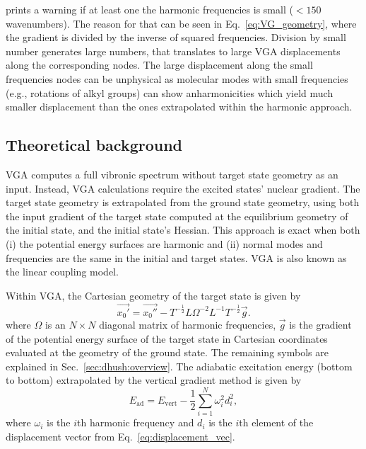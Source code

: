 \documentclass[11pt]{article}
\begin{document}
\ezFCF{} prints a warning if at least one the harmonic frequencies is 
small ($< 150$ wavenumbers). The reason for that can be seen in 
Eq.~\eqref{eq:VG_geometry}, where the gradient is divided by the inverse
of squared frequencies. Division by small number generates large numbers,
that translates to large VGA displacements along the corresponding nodes.
The large displacement along the small frequencies nodes can be unphysical
as molecular modes with small frequencies (e.g., rotations of alkyl groups)
can show anharmonicities which yield much smaller displacement than the 
ones extrapolated within the harmonic approach.

\subsection{Theoretical background}
\label{sec:vga:equations}
VGA computes a full vibronic spectrum without target state geometry as an input.
Instead, VGA calculations require the excited states' nuclear gradient. The target 
state geometry is extrapolated from the ground state geometry, using both the 
input gradient of the target state computed at the equilibrium geometry of the 
initial state, and the initial state's Hessian. This approach is exact when both
(i) the potential energy surfaces are harmonic and 
(ii) normal modes and frequencies are the same in the initial and target states.
VGA is also known as the linear coupling model.


Within VGA, the Cartesian geometry of the target state 
is given by
\begin{equation}
    \label{eq:VG_geometry}
    \vec{x _0 '}
    =
    \vec{x _0 ''}
    -
    T ^{-\frac{1}{2}} L 
    \Omega ^{-2} 
    L ^{-1} T ^{-\frac{1}{2}} 
    \vec{g}.
\end{equation}
where $\Omega$ is an $N \times N$ diagonal matrix of harmonic frequencies, $\vec{g}$ is the gradient
of  the potential energy surface of the target state in Cartesian coordinates evaluated at the geometry of the ground state. The remaining symbols are explained in Sec.~\ref{sec:dhush:overview}. The adiabatic excitation energy (bottom to bottom) extrapolated by the vertical gradient method is given by
\begin{equation}
    \label{eq:VG_energy}
    E _\text{ad} = E _\text{vert} - \frac{1}{2} \sum _{i = 1} ^N \omega _i ^2 d _i ^2,
\end{equation}
where $\omega _i$ is the $i$th harmonic frequency and $d _i$ is the $i$th element of the displacement vector from Eq.~\eqref{eq:displacement_vec}.
\end{document}
